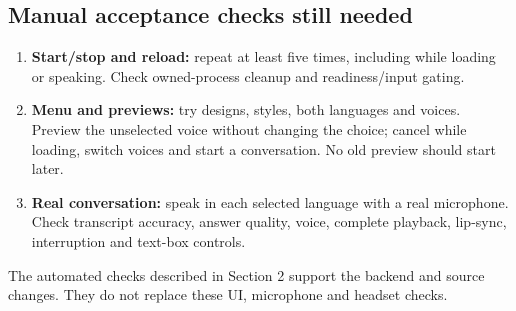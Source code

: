 \subsection{Manual acceptance checks still needed}
\begin{enumerate}
\item \textbf{Start/stop and reload:} repeat at least five times, including while
loading or speaking. Check owned-process cleanup and readiness/input gating.
\item \textbf{Menu and previews:} try designs, styles, both languages and voices.
Preview the unselected voice without changing the choice; cancel while loading,
switch voices and start a conversation. No old preview should start later.
\item \textbf{Real conversation:} speak in each selected language with a real
microphone. Check transcript accuracy, answer quality, voice, complete playback,
lip-sync, interruption and text-box controls.
\end{enumerate}
The automated checks described in Section 2 support the backend and source
changes. They do not replace these UI, microphone and headset checks.
